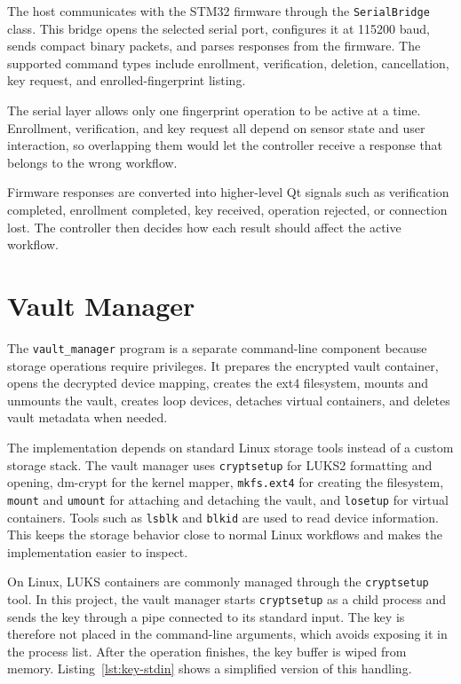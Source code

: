 The host communicates with the STM32 firmware through the \texttt{SerialBridge} class. This bridge opens the selected serial port, configures it at 115200 baud, sends compact binary packets, and parses responses from the firmware. The supported command types include enrollment, verification, deletion, cancellation, key request, and enrolled-fingerprint listing.

The serial layer allows only one fingerprint operation to be active at a time. Enrollment, verification, and key request all depend on sensor state and user interaction, so overlapping them would let the controller receive a response that belongs to the wrong workflow.

Firmware responses are converted into higher-level Qt signals such as verification completed, enrollment completed, key received, operation rejected, or connection lost. The controller then decides how each result should affect the active workflow.

\section{Vault Manager}

The \texttt{vault\_manager} program is a separate command-line component because storage operations require privileges. It prepares the encrypted vault container, opens the decrypted device mapping, creates the ext4 filesystem, mounts and unmounts the vault, creates loop devices, detaches virtual containers, and deletes vault metadata when needed.

The implementation depends on standard Linux storage tools instead of a custom storage stack. The vault manager uses \texttt{cryptsetup} for LUKS2 formatting and opening, dm-crypt for the kernel mapper, \texttt{mkfs.ext4} for creating the filesystem, \texttt{mount} and \texttt{umount} for attaching and detaching the vault, and \texttt{losetup} for virtual containers. Tools such as \texttt{lsblk} and \texttt{blkid} are used to read device information. This keeps the storage behavior close to normal Linux workflows and makes the implementation easier to inspect.

On Linux, LUKS containers are commonly managed through the \texttt{cryptsetup} tool. In this project, the vault manager starts \texttt{cryptsetup} as a child process and sends the key through a pipe connected to its standard input. The key is therefore not placed in the command-line arguments, which avoids exposing it in the process list. After the operation finishes, the key buffer is wiped from memory. Listing~\ref{lst:key-stdin} shows a simplified version of this handling.

